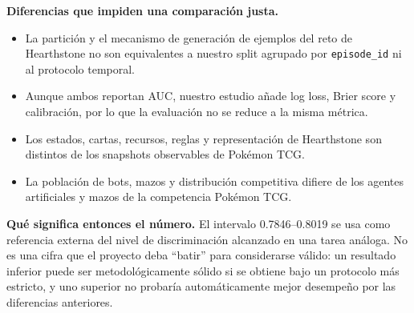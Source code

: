 \noindent\textbf{Diferencias que impiden una comparación justa.}
\begin{itemize}
  \item La partición y el mecanismo de generación de ejemplos del reto
  de Hearthstone no son equivalentes a nuestro split agrupado por
  \texttt{episode\_id} ni al protocolo temporal.
  \item Aunque ambos reportan AUC, nuestro estudio añade log loss,
  Brier score y calibración, por lo que la evaluación no se reduce a
  la misma métrica.
  \item Los estados, cartas, recursos, reglas y representación de
  Hearthstone son distintos de los snapshots observables de Pokémon
  TCG.
  \item La población de bots, mazos y distribución competitiva difiere
  de los agentes artificiales y mazos de la competencia Pokémon TCG.
\end{itemize}

\noindent\textbf{Qué significa entonces el número.} El intervalo
0.7846--0.8019 se usa como referencia externa del nivel de
discriminación alcanzado en una tarea análoga. No es una cifra que el
proyecto deba ``batir'' para considerarse válido: un resultado inferior
puede ser metodológicamente sólido si se obtiene bajo un protocolo más
estricto, y uno superior no probaría automáticamente mejor desempeño
por las diferencias anteriores.
